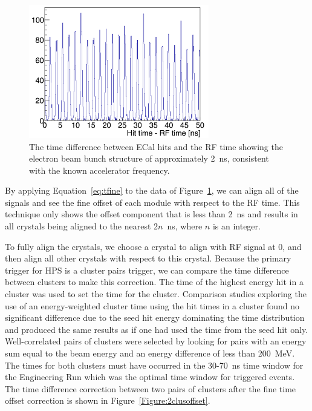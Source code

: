 \begin{figure}[htb]
  \centering
      \includegraphics[width=0.7\textwidth]{pics/performance/beamStructure.png}
  \caption[Time difference between ECal hits and RF time]{The time difference between ECal hits and the RF time showing the electron beam bunch structure of approximately 2~ns, consistent with the known accelerator frequency.}
  \label{Figure:beamBunch}
\end{figure}

By applying Equation~\eqref{eq:tfine} to the data of Figure~\ref{Figure:beamBunch}, we can align all of the signals and see the fine offset of each module with respect to the RF time. This technique only shows the offset component that is less than 2~ns and results in all crystals being aligned to the nearest 2$n$~ns, where $n$ is an integer. 

To fully align the crystals, we choose a crystal to align with RF signal at 0, and then align all other crystals with respect to this crystal. Because the primary trigger for HPS is a cluster pairs trigger, we can compare the time difference between clusters to make this correction. The time of the highest energy hit in a cluster was used to set the time for the cluster. Comparison studies exploring the use of an energy-weighted cluster time using the hit times in a cluster found no significant difference due to the seed hit energy dominating the time distribution and produced the same results as if one had used the time from the seed hit only. Well-correlated pairs of clusters were selected by looking for pairs with an energy sum equal to the beam energy and an energy difference of less than 200~MeV. The times for both clusters must have occurred in the 30-70~ns time window for the Engineering Run which was the optimal time window for triggered events. The time difference correction between two pairs of clusters after the fine time offset correction is shown in Figure~\ref{Figure:2clusoffset}.

